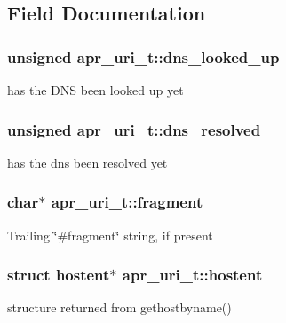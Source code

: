 \subsection{Field Documentation}
\subsubsection[{\texorpdfstring{dns\+\_\+looked\+\_\+up}{dns_looked_up}}]{\setlength{\rightskip}{0pt plus 5cm}unsigned apr\+\_\+uri\+\_\+t\+::dns\+\_\+looked\+\_\+up}\hypertarget{structapr__uri__t_ae28c03382cb6fcb226dfc76193699342}{}\label{structapr__uri__t_ae28c03382cb6fcb226dfc76193699342}
has the D\+NS been looked up yet 
\subsubsection[{\texorpdfstring{dns\+\_\+resolved}{dns_resolved}}]{\setlength{\rightskip}{0pt plus 5cm}unsigned apr\+\_\+uri\+\_\+t\+::dns\+\_\+resolved}\hypertarget{structapr__uri__t_a805976fea6ef65f3ec1185c7d6dcf7f3}{}\label{structapr__uri__t_a805976fea6ef65f3ec1185c7d6dcf7f3}
has the dns been resolved yet 
\subsubsection[{\texorpdfstring{fragment}{fragment}}]{\setlength{\rightskip}{0pt plus 5cm}char$\ast$ apr\+\_\+uri\+\_\+t\+::fragment}\hypertarget{structapr__uri__t_a0e4abeaa1379c79dcc6fdac01d76715a}{}\label{structapr__uri__t_a0e4abeaa1379c79dcc6fdac01d76715a}
Trailing \char`\"{}\#fragment\char`\"{} string, if present 
\subsubsection[{\texorpdfstring{hostent}{hostent}}]{\setlength{\rightskip}{0pt plus 5cm}struct hostent$\ast$ apr\+\_\+uri\+\_\+t\+::hostent}\hypertarget{structapr__uri__t_a2ec4edaa7288f3c1ebcb8cbca3d0379c}{}\label{structapr__uri__t_a2ec4edaa7288f3c1ebcb8cbca3d0379c}
structure returned from gethostbyname() 
